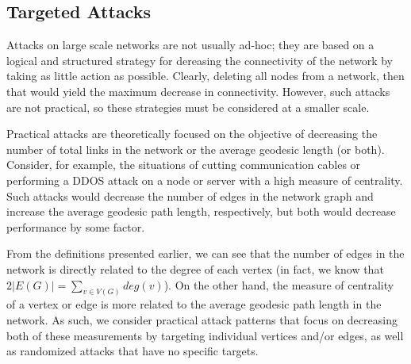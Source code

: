 \documentclass[doc]{apa}%
\begin{document}
\subsection{Targeted Attacks}
Attacks on large scale networks are not usually ad-hoc; they are based on a logical and structured strategy for dereasing the connectivity of the network by taking as little action as possible. Clearly, deleting all nodes from a network, then that would yield the maximum decrease in connectivity. However, such attacks are not practical, so these strategies must be considered at a smaller scale. 

Practical attacks are theoretically focused on the objective of decreasing the number of total links in the network or the average geodesic length (or both). Consider, for example, the situations of cutting communication cables or performing a DDOS attack on a node or server with a high measure of centrality. Such attacks would decrease the number of edges in the network graph and increase the average geodesic path length, respectively, but both would decrease performance by some factor.

From the definitions presented earlier, we can see that the number of edges in the network is directly related to the degree of each vertex (in fact, we know that $2|E(G)| =\sum_{v \in V(G)}deg(v)$). On the other hand, the measure of centrality of a vertex or edge is more related to the average geodesic path length in the network. As such, we consider practical attack patterns that focus on decreasing both of these measurements by targeting individual vertices and/or edges, as well as randomized attacks that have no specific targets. 
\end{document}
